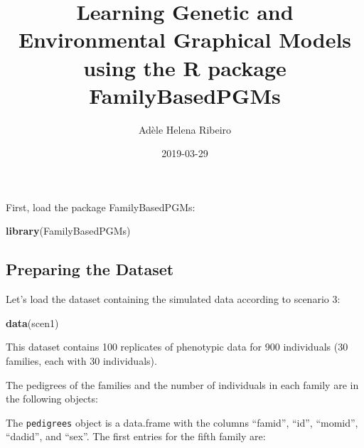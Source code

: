 \documentclass[]{article}
\title{Learning Genetic and Environmental Graphical Models using the R package
FamilyBasedPGMs}
\author{Adèle Helena Ribeiro}
\date{2019-03-29}
\newenvironment{Shaded}{\begin{snugshade}}{\end{snugshade}}
\newcommand{\KeywordTok}[1]{\textcolor[rgb]{0.13,0.29,0.53}{\textbf{#1}}}
\newcommand{\StringTok}[1]{\textcolor[rgb]{0.31,0.60,0.02}{#1}}
\newcommand{\OperatorTok}[1]{\textcolor[rgb]{0.81,0.36,0.00}{\textbf{#1}}}
\newcommand{\NormalTok}[1]{#1}
\begin{document}
\maketitle

First, load the package FamilyBasedPGMs:

\begin{Shaded}
\begin{Highlighting}[]
\KeywordTok{library}\NormalTok{(FamilyBasedPGMs)}
\end{Highlighting}
\end{Shaded}

\subsection{Preparing the Dataset}\label{preparing-the-dataset}

Let's load the dataset containing the simulated data according to
scenario 3:

\begin{Shaded}
\begin{Highlighting}[]
\KeywordTok{data}\NormalTok{(scen1)}
\end{Highlighting}
\end{Shaded}

This dataset contains 100 replicates of phenotypic data for 900
individuals (30 families, each with 30 individuals).

The pedigrees of the families and the number of individuals in each
family are in the following objects:

\begin{Shaded}
\end{Shaded}

The \texttt{pedigrees} object is a data.frame with the columns
``famid'', ``id'', ``momid'', ``dadid'', and ``sex''. The first entries
for the fifth family are:
\end{document}
